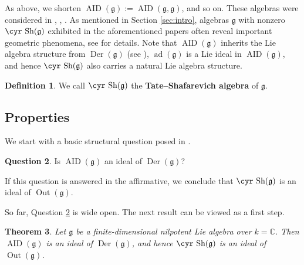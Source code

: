 \documentclass[11pt,reqno]{amsart}
\numberwithin{equation}{section}
\newtheorem{theorem}{Theorem}[section]
\theoremstyle{definition}
\newtheorem{question}[theorem]{Question}
\newtheorem{definition}[theorem]{Definition}
\newcommand{\Out}{{\operatorname{ Out}}}
\newcommand{\AID}{{\operatorname{ AID}}}
\newcommand{\Der}{{\operatorname{ Der}}}
\newcommand{\ad}{{\operatorname{ ad}}}
\def\Sha{\text{\cyr Sh}}
\def\g{\mathfrak g}
\begin{document}
As above, we shorten $\AID (\g):=\AID (\g,\g)$, and so on.
These algebras were considered in \cite{GW}, \cite{SMSB}, \cite{BDV1}.
As mentioned in Section \ref{sec:intro},
algebras $\g$ with nonzero $\Sha (\g)$ exhibited in the aforementioned papers often reveal important
geometric phenomena, see \cite{GW} for details. Note that $\AID (\g )$ inherits the Lie algebra structure from
$\Der (\g)$ (see \cite[Proof of Proposition 2.3]{BDV1}), $\ad (\g )$ is a Lie ideal in $\AID (\g )$, and hence
$\Sha (\g )$ also carries a natural Lie algebra structure.

\begin{definition} \label{def:sha-lie}
We call $\Sha (\g)$ the {\bf {Tate--Shafarevich algebra}} of $\g$.
\end{definition}

\subsection{Properties}
We start with a basic structural question posed in \cite{BDV1}.

\begin{question} \label{q:ideal-lie}
Is $\AID(\g)$ an ideal of $\Der (\g)$?
\end{question}

If this question is answered in the affirmative, we conclude that $\Sha (\g)$
is an ideal of $\Out (\g)$.

So far, Question \ref{q:ideal-lie} is wide open. The next result can be viewed as a first step.

\begin{theorem} \label{th:ideal-lie}
Let $\g$ be a finite-dimensional nilpotent Lie algebra over $k=\mathbb C$.
Then  $\AID(\g)$ is an ideal of $\Der (\g)$, and hence $\Sha (\g)$
is an ideal of $\Out (\g)$.
\end{theorem}
\end{document}
